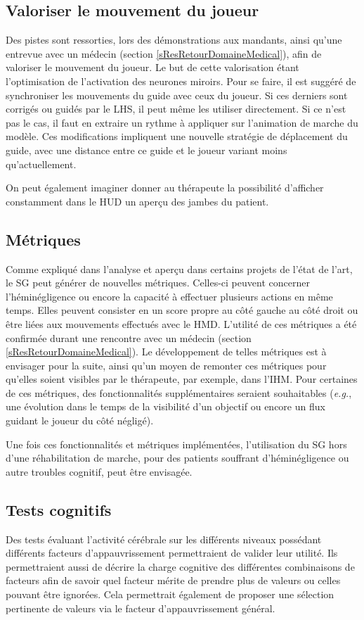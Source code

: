 	\subsection*{Valoriser le mouvement du joueur}
		Des pistes sont ressorties, lors des démonstrations aux mandants, ainsi qu'une entrevue avec un médecin (section \ref{sResRetourDomaineMedical}), afin de valoriser le mouvement du joueur. Le but de cette valorisation étant l'optimisation de l'activation des neurones miroirs. Pour se faire, il est suggéré de synchroniser les mouvements du guide avec ceux du joueur. Si ces derniers sont corrigés ou guidés par le LHS, il peut même les utiliser directement. Si ce n'est pas le cas, il faut en extraire un rythme à appliquer sur l'animation de marche du modèle. Ces modifications impliquent une nouvelle stratégie de déplacement du guide, avec une distance entre ce guide et le joueur variant moins qu'actuellement.
		
		On peut également imaginer donner au thérapeute la possibilité d'afficher constamment dans le HUD un aperçu des jambes du patient.
		
	\subsection*{Métriques}
		Comme expliqué dans l'analyse et aperçu dans certains projets de l'état de l'art, le SG peut générer de nouvelles métriques. Celles-ci peuvent concerner l'héminégligence ou encore la capacité à effectuer plusieurs actions en même temps. Elles peuvent consister en un score propre au côté gauche au côté droit ou être liées aux mouvements effectués avec le HMD. L'utilité de ces métriques a été confirmée durant une rencontre avec un médecin (section \ref{sResRetourDomaineMedical}). Le développement de telles métriques est à envisager pour la suite, ainsi qu'un moyen de remonter ces métriques pour qu'elles soient visibles par le thérapeute, par exemple, dans l'IHM. Pour certaines de ces métriques, des fonctionnalités supplémentaires seraient souhaitables (\textit{e.g.}, une évolution dans le temps de la visibilité d'un objectif ou encore un flux guidant le joueur du côté négligé).
		
		Une fois ces fonctionnalités et métriques implémentées, l'utilisation du SG hors d'une réhabilitation de marche, pour des patients souffrant d'héminégligence ou autre troubles cognitif, peut être envisagée.
		
	\subsection*{Tests cognitifs}
		Des tests évaluant l'activité cérébrale sur les différents niveaux possédant différents facteurs d'appauvrissement permettraient de valider leur utilité. Ils permettraient aussi de décrire la charge cognitive des différentes combinaisons de facteurs afin de savoir quel facteur mérite de prendre plus de valeurs ou celles pouvant être ignorées. Cela permettrait également de proposer une sélection pertinente de valeurs via le facteur d'appauvrissement général.
		

